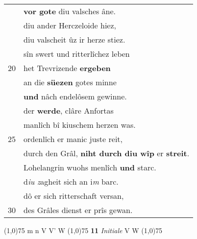 \documentclass[8pt,a4paper,notitlepage]{article}
\begin{document}
\begin{table}[ht]
\begin{minipage}[t]{0.5\linewidth}
\begin{tabular}{rl}
 & \textbf{vor gote} diu valsches âne.\\ 
 & diu ander Herczeloide hiez,\\ 
 & diu valscheit ûz ir herze stiez.\\ 
 & sîn swert und ritterlîchez leben\\ 
20 & het Trevrizende \textbf{ergeben}\\ 
 & an die \textbf{süezen} gotes minne\\ 
 & \textbf{und} nâch endelôsem gewinne.\\ 
 & der \textbf{werde}, clâre Anfortas\\ 
 & manlîch bî kiuschem herzen was.\\ 
25 & ordenlîch er manic juste reit,\\ 
 & durch den Grâl, \textbf{niht durch diu wîp} er \textbf{streit}.\\ 
 & Lohelangrin wuohs menlîch \textbf{und} starc.\\ 
 & d\textit{iu} \textit{z}agheit sich an i\textit{m} barc.\\ 
 & dô er sich ritterschaft versan,\\ 
30 & des Grâles dienst er prîs gewan.\\ 
\end{tabular}
\scriptsize
\line(1,0){75} \newline
m n V V' W \newline
\line(1,0){75} \newline
\textbf{11} \textit{Initiale} V W  \newline
\line(1,0){75} \newline

\end{minipage}
\end{table}
\end{document}
